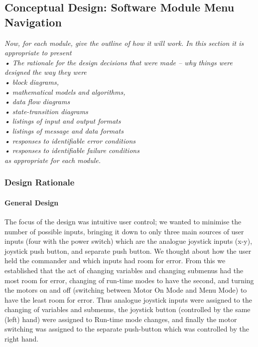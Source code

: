 \documentclass{article}
\begin{document}
	\subsection{Conceptual Design: Software Module Menu Navigation}
\textit{	Now, for each module, give the outline of how it will work. In this section it is appropriate to present \\
	•	The rationale for the design decisions that were made – why things were designed the way they were\\
	•	block diagrams,\\
	•	mathematical models and algorithms,\\
	•	data flow diagrams\\
	•	state-transition diagrams\\
	•	listings of input and output formats\\
	•	listings of message and data formats\\
	•	responses to identifiable error conditions\\
	•	responses to identifiable failure conditions\\
	as appropriate for each module.}
	
	
	
	\subsubsection{Design Rationale}
	\paragraph{General Design}
	The focus of the design was intuitive user control; we wanted to minimise the number of possible inputs, bringing it down to only three main sources of user inputs (four with the power switch) which are the analogue joystick inputs (x-y), joystick push button, and separate push button. We thought about how the user held the commander and which inputs had room for error. From this we established that the act of changing variables and changing submenus had the most room for error, changing of run-time modes to have the second, and turning the motors on and off (switching between Motor On Mode and Menu Mode) to have the least room for error. Thus analogue joystick inputs were assigned to the changing of variables and submenus, the joystick button (controlled by the same (left) hand) were assigned to Run-time mode changes, and finally the motor switching was assigned to the separate push-button which was controlled by the right hand.\\
	
\end{document}
